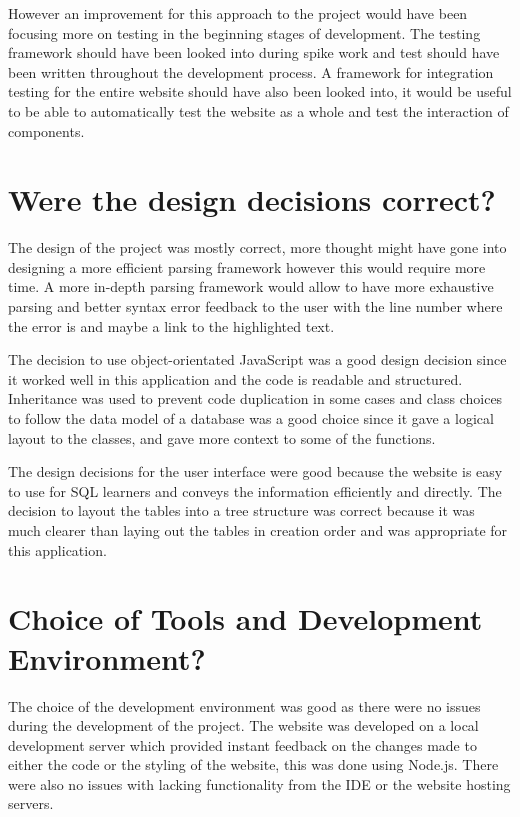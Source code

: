 However an improvement for this approach to the project would have been focusing more on testing in the beginning stages of development. The testing framework should have been looked into during spike work and test should have been written throughout the development process. A framework for integration testing for the entire website should have also been looked into, it would be useful to be able to automatically test the website as a whole and test the interaction of components.

\section{Were the design decisions correct?}

The design of the project was mostly correct, more thought might have gone into designing a more efficient parsing framework however this would require more time. A more in-depth parsing framework would allow to have more exhaustive parsing and better syntax error feedback to the user with the line number where the error is and maybe a link to the highlighted text.

The decision to use object-orientated JavaScript was a good design decision since it worked well in this application and the code is readable and structured. Inheritance was used to prevent code duplication in some cases and class choices to follow the data model of a database was a good choice since it gave a logical layout to the classes, and gave more context to some of the functions.

The design decisions for the user interface were good because the website is easy to use for SQL learners and conveys the information efficiently and directly. The decision to layout the tables into a tree structure was correct because it was much clearer than laying out the tables in creation order and was appropriate for this application.

\section{Choice of Tools and Development Environment?}

The choice of the development environment was good as there were no issues during the development of the project. The website was developed on a local development server which provided instant feedback on the changes made to either the code or the styling of the website, this was done using Node.js. There were also no issues with lacking functionality from the IDE or the website hosting servers. 

